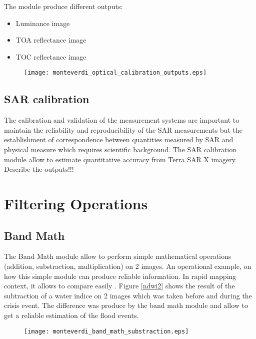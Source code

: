 \documentclass{InsightSoftwareGuide}
\begin{document}
The module produce different outputs:

\begin{itemize}
\item Luminance image
\item TOA reflectance image
\item TOC reflectance image
\end{itemize}


\begin{figure}
   \center
   \texttt{[image: monteverdi\_optical\_calibration\_outputs.eps]}
   \label{fig:opticalcalibrationoutput}
\end{figure}

\subsection{SAR calibration}

The calibration and validation of the measurement systems are important to maintain the
reliability and reproducibility of the SAR measurements but the establishment of correspondence between quantities measured 
by SAR and physical measure which requires scientific background. The SAR calibration module allow to estimate quantitative accuracy
from Terra SAR X imagery.
Describe the outputs!!!

\section{Filtering Operations}
\subsection{Band Math}
The Band Math module allow to perform simple mathematical operations (addition, substraction, multiplication) on 2 images. 
An operational example, on how this simple module can produce reliable information.
In rapid mapping context, it allows to compare easily . Figure \ref{ndwi2} shows the result of the subtraction of a water indice on 2 images
which was taken before and during the crisis event. 
The difference was produce by the band math module and allow to get a reliable estimation of the flood events.

\begin{figure}
   \center
   \texttt{[image: monteverdi\_band\_math\_substraction.eps]}
   \label{fig:concatenate}
\end{figure}
\end{document}
